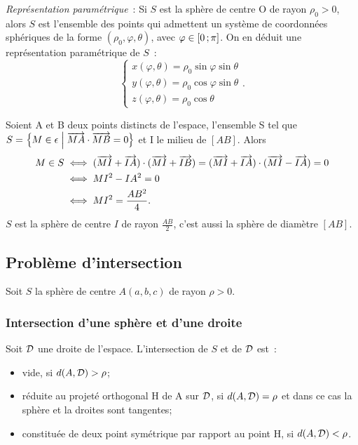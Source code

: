 \emph{Représentation paramétrique}~: Si \(S\) est la sphère de centre O de
rayon \(\rho_0 > 0\), alors \(S\) est l'ensemble des points qui admettent un
système de coordonnées sphériques de la forme \((\rho_0, \varphi, \theta)\),
avec \(\varphi\in\left[ 0 \, ; {} \pi \right]\). On en déduit une représentation
paramétrique de \(S\)~:
\begin{equation}
  \begin{cases}
    x(\varphi, \theta) = \rho_0\sin\varphi\sin\theta\\
    y(\varphi, \theta) = \rho_0\cos\varphi\sin\theta\\
    z(\varphi, \theta) = \rho_0\cos\theta
  \end{cases}.
\end{equation}

Soient A et B deux points distincts de l'espace, l'ensemble S tel que \(S =
\left\{M \in \epsilon\mathrel{}\middle|\mathrel{}\overrightarrow{MA}\cdot\overrightarrow{MB} = 0\right\}\) et I le milieu de
\([AB]\).  Alors
\begin{align}
  M \in S & \iff (\overrightarrow{MI} + \overrightarrow{IA}) \cdot (\overrightarrow{MI} + \overrightarrow{IB}) =
  (\overrightarrow{MI} + \overrightarrow{IA}) \cdot (\overrightarrow{MI} - \overrightarrow{IA}) = 0\\
          &\iff MI^2 - IA^2 = 0\\
          &\iff MI^2 = \frac{AB^2}{4}.
\end{align}
\(S\) est la sphère de centre \(I\) de rayon \(\frac{AB}{2}\), c'est aussi
la sphère de diamètre \([AB]\).

\subsection{Problème d'intersection}
Soit \(S\) la sphère de centre \(A(a, b, c)\) de rayon \(\rho>0\).

\subsubsection{Intersection d'une sphère et d'une droite}

\begin{prop}
  Soit \(\mathcal{D}\) une droite de l'espace. L'intersection de \(S\) et de \(\mathcal{D}\)
  est~:
  \begin{itemize}
    \item vide, si \(d(A, \mathcal{D})>\rho\);
    \item réduite au projeté orthogonal H de A sur \(\mathcal{D}\), si \(d(A, \mathcal{D}) =
      \rho\) et dans ce cas la sphère et la droites sont tangentes;
    \item constituée de deux point symétrique par rapport au point H, si
      \(d(A, \mathcal{D}) < \rho\).
  \end{itemize}
\end{prop}


